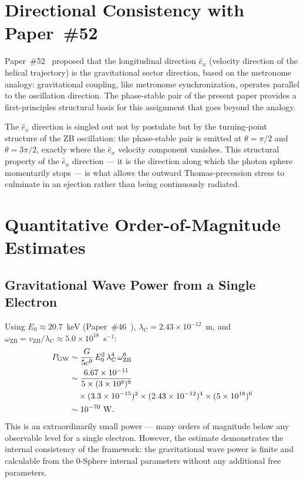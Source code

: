 \documentclass[%
 reprint, amsmath,amssymb, aps, prb, ]{revtex4-2}
\numberwithin{equation}{section}
\newcommand{\iphase}{\theta}
\newcommand{\omZB}{\omega_{\text{ZB}}}
\newcommand{\vZB}{v_{\mathrm{ZB}}}
\newcommand{\lambdaC}{\lambda_{\mathrm{C}}}
\newcommand{\ehat}[1]{\hat{e}_{#1}}
\begin{document}
\section{\texorpdfstring{Directional Consistency with Paper~\#52}{Directional Consistency with Paper 52}}
\label{sec:directional}

Paper~\#52~\cite{hanamura52} proposed that the longitudinal direction $\ehat{x}$ (velocity direction of the helical trajectory) is the gravitational sector direction, based on the metronome analogy: gravitational coupling, like metronome synchronization, operates parallel to the oscillation direction.
The phase-stable pair of the present paper provides a first-principles structural basis for this assignment that goes beyond the analogy.

The $\ehat{x}$ direction is singled out not by postulate but by the turning-point structure of the ZB oscillation: the phase-stable pair is emitted at $\iphase = \pi/2$ and $\iphase = 3\pi/2$, exactly where the $\ehat{x}$ velocity component vanishes.
This structural property of the $\ehat{x}$ direction --- it is the direction along which the photon sphere momentarily stops --- is what allows the outward Thomas-precession stress to culminate in an ejection rather than being continuously radiated.

\section{Quantitative Order-of-Magnitude Estimates}
\label{sec:estimates}

\subsection{Gravitational Wave Power from a Single Electron}

Using $E_0 \approx 20.7$~keV (Paper~\#46~\cite{hanamura46}), $\lambdaC = 2.43\times10^{-12}$~m, and $\omZB = \vZB/\lambdaC \approx 5.0\times10^{18}$~s$^{-1}$:
\begin{align}
P_\mathrm{GW} &\sim \frac{G}{5c^9}\,E_0^2\,\lambdaC^4\,\omZB^6
\notag\\
&\sim \frac{6.67\times10^{-11}}{5\times(3\times10^8)^9}
\notag\\
&\quad\times(3.3\times10^{-15})^2
\times(2.43\times10^{-12})^4
\times(5\times10^{18})^6
\notag\\
&\sim 10^{-70}\ \text{W}.
\label{eq:P_num}
\end{align}
This is an extraordinarily small power --- many orders of magnitude below any observable level for a single electron.
However, the estimate demonstrates the internal consistency of the framework: the gravitational wave power is finite and calculable from the 0-Sphere internal parameters without any additional free parameters.
\end{document}
